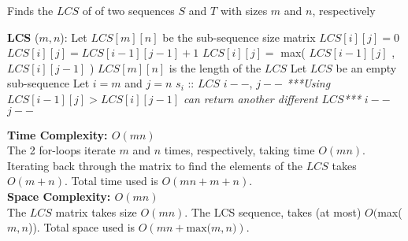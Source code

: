\documentclass[11pt]{article}
\theoremstyle{definition}
\theoremstyle{plain}
\theoremstyle{indented-remark}
\theoremstyle{indented-proof}
\begin{document}
\pagebreak

\begin{algorithm}
\caption{Finds the $LCS$ of of two sequences $S$ and $T$ with sizes $m$ and $n$, respectively}
\begin{algorithmic} 
\STATE \textbf{LCS} ($m,n$):
\STATE Let $LCS[m][n]$ be the sub-sequence size matrix
\STATE $LCS[i][j]=0$
\STATE $LCS[i][j]=LCS[i-1][j-1]+1$
\ELSE
\STATE $LCS[i][j]=$ max( $LCS[i-1][j]$ , $LCS[i][j-1]$ )
\ENDIF
\ENDFOR
\ENDFOR
\STATE $LCS[m][n]$ is the length of the $LCS$
\STATE
\STATE Let $LCS$ be an empty sub-sequence 
\STATE Let $i = m$ and $j = n$
\STATE $s_{i}$ :: $LCS$ 
\STATE $i--$, $j--$
\STATE \textit{***Using $LCS[i-1][j]>LCS[i][j-1]$ can return another different $LCS$***}
\STATE $i--$
\ELSE 
\STATE $j--$
\ENDIF
\ENDWHILE 
\end{algorithmic}
\end{algorithm}

\noindent \textbf{Time Complexity: $O(mn)$} \\
\noindent The 2 for-loops iterate $m$ and $n$ times, respectively, taking time $O(mn)$. Iterating back through the matrix to find the elements of the $LCS$ takes $O(m+n)$. Total time used is $O(mn + m + n)$.\\

\noindent \textbf{Space Complexity: $O(mn)$} \\
\noindent The $LCS$ matrix takes size $O(mn)$. The LCS sequence, takes (at most) $O($max($m,n$)). Total space used is $O(mn + \text{max($m,n$)})$.
\end{document}
